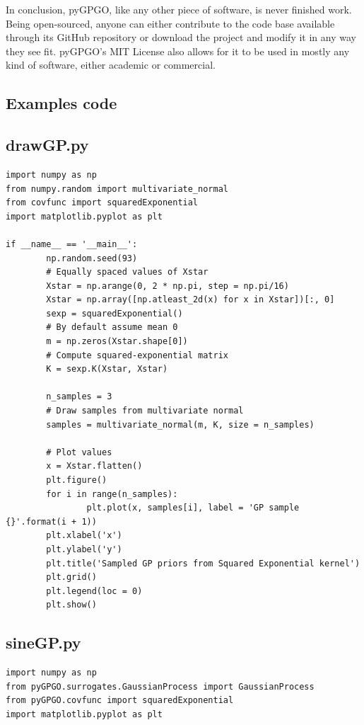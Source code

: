 \documentclass[10pt,a4paper,twoside]{book}
\begin{document}
In conclusion, pyGPGO, like any other piece of software, is never finished work. Being open-sourced, anyone can either contribute to the code base available through its GitHub repository or download the project and modify it in any way they see fit. pyGPGO's MIT License also allows for it to be used in mostly any kind of software, either academic or commercial.

\begin{appendices}

\chapter{Examples code}
\label{appendix:code}

\section{drawGP.py}
\label{drawGP}
\begin{verbatim}
import numpy as np
from numpy.random import multivariate_normal
from covfunc import squaredExponential
import matplotlib.pyplot as plt

if __name__ == '__main__':
        np.random.seed(93)
        # Equally spaced values of Xstar
        Xstar = np.arange(0, 2 * np.pi, step = np.pi/16)
        Xstar = np.array([np.atleast_2d(x) for x in Xstar])[:, 0]
        sexp = squaredExponential()
        # By default assume mean 0
        m = np.zeros(Xstar.shape[0])
        # Compute squared-exponential matrix
        K = sexp.K(Xstar, Xstar)

        n_samples = 3
        # Draw samples from multivariate normal
        samples = multivariate_normal(m, K, size = n_samples)

        # Plot values
        x = Xstar.flatten()
        plt.figure()
        for i in range(n_samples):
                plt.plot(x, samples[i], label = 'GP sample {}'.format(i + 1))
        plt.xlabel('x')
        plt.ylabel('y')
        plt.title('Sampled GP priors from Squared Exponential kernel')
        plt.grid()
        plt.legend(loc = 0)
        plt.show()	
\end{verbatim}

\section{sineGP.py}
\label{sineGP}
\begin{verbatim}
import numpy as np
from pyGPGO.surrogates.GaussianProcess import GaussianProcess
from pyGPGO.covfunc import squaredExponential
import matplotlib.pyplot as plt


\end{verbatim}
\end{appendices}
\end{document}
